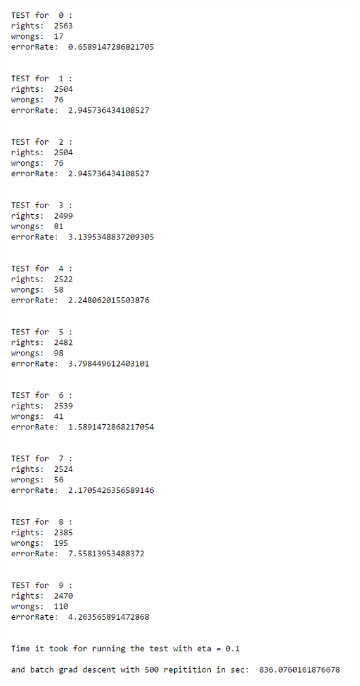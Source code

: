 \documentclass[paper=a4, fontsize=11pt]{scrartcl} %
\numberwithin{equation}{section} %
\numberwithin{figure}{section} %
\numberwithin{table}{section} %
\begin{document}
    \begin{figure}
   		\begin{subfigure}[t]{\textwidth}
    		\centering
    		\includegraphics[height=9.5in]{batchrun}
    	\end{subfigure}
    \end{figure}
    
\end{document}
